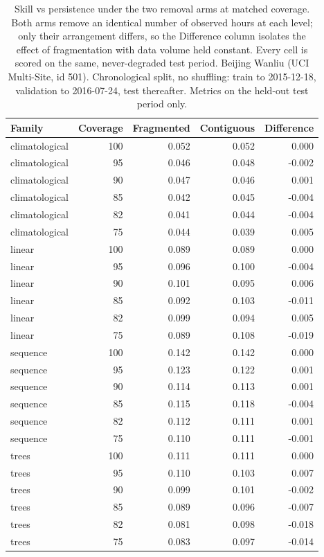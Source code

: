 \begin{table}[htbp]
\caption{Skill vs persistence under the two removal arms at matched coverage. Both arms remove an identical number of observed hours at each level; only their arrangement differs, so the Difference column isolates the effect of fragmentation with data volume held constant. Every cell is scored on the same, never-degraded test period. Beijing Wanliu (UCI Multi-Site, id 501). Chronological split, no shuffling: train to 2015-12-18, validation to 2016-07-24, test thereafter. Metrics on the held-out test period only.}
\label{tab:ablation_arm_gap}
\begin{tabular}{lrrrr}
\toprule
Family & Coverage & Fragmented & Contiguous & Difference \\
\midrule
climatological & 100 & 0.052 & 0.052 & 0.000 \\
climatological & 95 & 0.046 & 0.048 & -0.002 \\
climatological & 90 & 0.047 & 0.046 & 0.001 \\
climatological & 85 & 0.042 & 0.045 & -0.004 \\
climatological & 82 & 0.041 & 0.044 & -0.004 \\
climatological & 75 & 0.044 & 0.039 & 0.005 \\
linear & 100 & 0.089 & 0.089 & 0.000 \\
linear & 95 & 0.096 & 0.100 & -0.004 \\
linear & 90 & 0.101 & 0.095 & 0.006 \\
linear & 85 & 0.092 & 0.103 & -0.011 \\
linear & 82 & 0.099 & 0.094 & 0.005 \\
linear & 75 & 0.089 & 0.108 & -0.019 \\
sequence & 100 & 0.142 & 0.142 & 0.000 \\
sequence & 95 & 0.123 & 0.122 & 0.001 \\
sequence & 90 & 0.114 & 0.113 & 0.001 \\
sequence & 85 & 0.115 & 0.118 & -0.004 \\
sequence & 82 & 0.112 & 0.111 & 0.001 \\
sequence & 75 & 0.110 & 0.111 & -0.001 \\
trees & 100 & 0.111 & 0.111 & 0.000 \\
trees & 95 & 0.110 & 0.103 & 0.007 \\
trees & 90 & 0.099 & 0.101 & -0.002 \\
trees & 85 & 0.089 & 0.096 & -0.007 \\
trees & 82 & 0.081 & 0.098 & -0.018 \\
trees & 75 & 0.083 & 0.097 & -0.014 \\
\bottomrule
\end{tabular}
\end{table}
